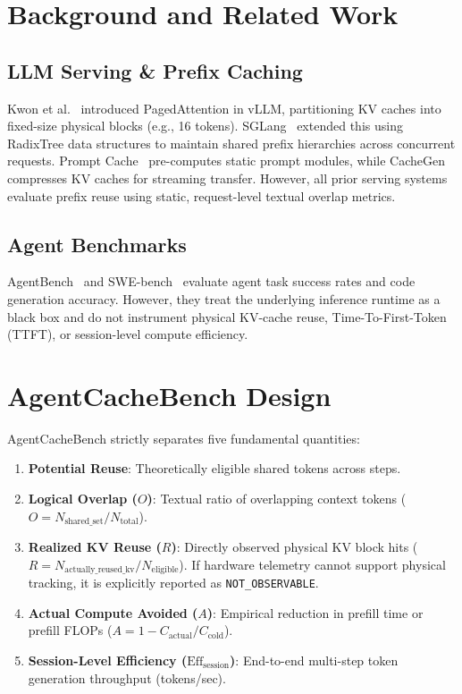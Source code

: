 \documentclass[10pt,journal,compsoc]{IEEEtran}
\begin{document}
\section{Background and Related Work}

\subsection{LLM Serving \& Prefix Caching}
Kwon et al.~\cite{kwon2023vllm} introduced PagedAttention in vLLM, partitioning KV caches into fixed-size physical blocks (e.g., 16 tokens). SGLang~\cite{zheng2024sglang} extended this using RadixTree data structures to maintain shared prefix hierarchies across concurrent requests. Prompt Cache~\cite{gim2024promptcache} pre-computes static prompt modules, while CacheGen~\cite{ye2024cachegen} compresses KV caches for streaming transfer. However, all prior serving systems evaluate prefix reuse using static, request-level textual overlap metrics.

\subsection{Agent Benchmarks}
AgentBench~\cite{liu2024agentbench} and SWE-bench~\cite{jimenez2024swebench} evaluate agent task success rates and code generation accuracy. However, they treat the underlying inference runtime as a black box and do not instrument physical KV-cache reuse, Time-To-First-Token (TTFT), or session-level compute efficiency.

\section{AgentCacheBench Design}

AgentCacheBench strictly separates five fundamental quantities:
\begin{enumerate}
    \item \textbf{Potential Reuse}: Theoretically eligible shared tokens across steps.
    \item \textbf{Logical Overlap ($O$)}: Textual ratio of overlapping context tokens ($O = N_{\text{shared\_set}} / N_{\text{total}}$).
    \item \textbf{Realized KV Reuse ($R$)}: Directly observed physical KV block hits ($R = N_{\text{actually\_reused\_kv}} / N_{\text{eligible}}$). If hardware telemetry cannot support physical tracking, it is explicitly reported as \texttt{NOT\_OBSERVABLE}.
    \item \textbf{Actual Compute Avoided ($A$)}: Empirical reduction in prefill time or prefill FLOPs ($A = 1 - C_{\text{actual}} / C_{\text{cold}}$).
    \item \textbf{Session-Level Efficiency ($\text{Eff}_{\text{session}}$)}: End-to-end multi-step token generation throughput (tokens/sec).
\end{enumerate}
\end{document}
